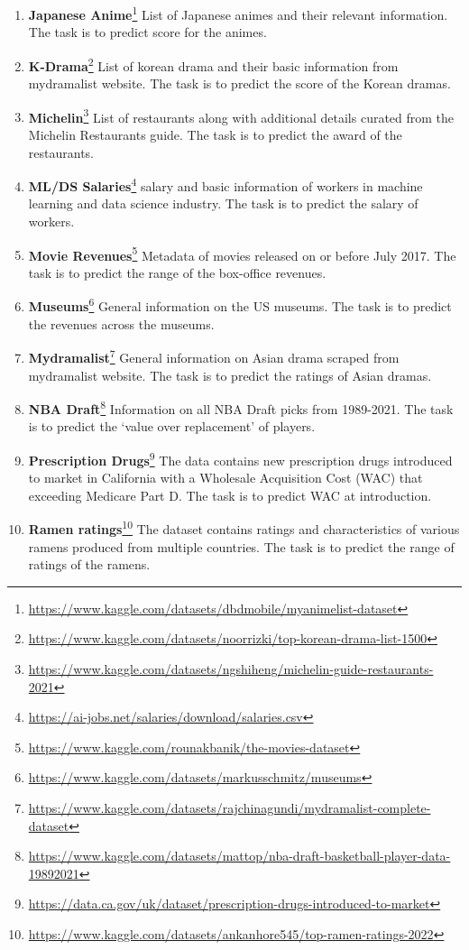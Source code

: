 \documentclass{article}
\theoremstyle{plain}
\theoremstyle{definition}
\theoremstyle{remark}
\begin{document}
\begin{enumerate}
    \item  \textbf{Japanese Anime}\footnote{\url{https://www.kaggle.com/datasets/dbdmobile/myanimelist-dataset}} List of Japanese animes and their relevant information. The task is to predict score for the animes.
    \item  \textbf{K-Drama}\footnote{\url{https://www.kaggle.com/datasets/noorrizki/top-korean-drama-list-1500}} List of korean drama and their basic information from mydramalist website. The task is to predict the score of the Korean dramas.
    \item  \textbf{Michelin}\footnote{\url{https://www.kaggle.com/datasets/ngshiheng/michelin-guide-restaurants-2021}} List of restaurants along with additional details curated from the Michelin Restaurants guide. The task is to predict the award of the restaurants.
    \item  \textbf{ML/DS Salaries}\footnote{\url{https://ai-jobs.net/salaries/download/salaries.csv}} salary and basic information of workers in machine learning and data science industry. The task is to predict the salary of workers.
    \item  \textbf{Movie Revenues}\footnote{\url{https://www.kaggle.com/rounakbanik/the-movies-dataset}} Metadata of movies released on or before July 2017. The task is to predict the range of the box-office revenues. 
    \item  \textbf{Museums}\footnote{\url{https://www.kaggle.com/datasets/markusschmitz/museums}} General information on the US museums. The task is to predict the revenues across the museums.
    \item  \textbf{Mydramalist}\footnote{\url{https://www.kaggle.com/datasets/rajchinagundi/mydramalist-complete-dataset}} General information on Asian drama scraped from mydramalist website. The task is to predict the ratings of Asian dramas.
    \item  \textbf{NBA Draft}\footnote{\url{https://www.kaggle.com/datasets/mattop/nba-draft-basketball-player-data-19892021}} Information on all NBA Draft picks from 1989-2021. The task is to predict the `value over replacement' of players.
    \item  \textbf{Prescription Drugs}\footnote{\url{https://data.ca.gov/uk/dataset/prescription-drugs-introduced-to-market}} The data contains new prescription drugs introduced to market in California with a Wholesale Acquisition Cost (WAC) that exceeding Medicare Part D. The task is to predict WAC at introduction.
    \item \textbf{Ramen ratings}\footnote{\url{https://www.kaggle.com/datasets/ankanhore545/top-ramen-ratings-2022}} The dataset contains ratings and characteristics of various ramens produced from multiple countries. The task is to predict the range of ratings of the ramens.

\end{enumerate}
\end{document}
